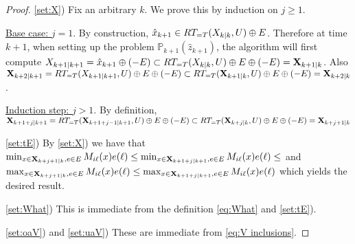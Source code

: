 \begin{proof}
	
\ref{set:X}) 
Fix an arbitrary $k$. We prove this by induction on $j \geq 1$.

\underline{Base case: $j=1$}. By construction, $\hat{x}_{k+1} \in RT_{=T}(X_{k|k},U) \oplus E$.
Therefore at time $k+1$, when setting up the problem $\mathbb{P}_{k+1}(\hat{z}_{k+1})$, the algorithm will first compute
$X_{k+1|k+1} = \hat{x}_{k+1} \oplus (-E)  \subset RT_{=T}(X_{k|k},U) \oplus E \oplus (-E) = \mathbf{X}_{k+1|k}$.
Also 
$\mathbf{X}_{k+2|k+1} = RT_{=T}(X_{k+1|k+1},U) \oplus E \oplus(-E) \subset  RT_{=T}(\mathbf{X}_{k+1|k},U) \oplus E \oplus(-E) = \mathbf{X}_{k+2|k}$.

\underline{Induction step: $j > 1$}.
By definition, $\mathbf{X}_{k+1+j|k+1} = RT_{=T}(\mathbf{X}_{k+1+j-1|k+1},U) \oplus E \oplus (-E) \subset  RT_{=T}(\mathbf{X}_{k+j|k},U) \oplus E \oplus (-E) = \mathbf{X}_{k+j+1|k}$

\ref{set:tE}) 	By \ref{set:X}) 
 we have that 
 $ \min_{x \in \mathbf{X}_{k+j+1|k}, e \in E} M_{i\ell}(x)e(\ell) \leq \min_{x \in \mathbf{X}_{k+1+j|k+1}, e \in E} M_{i\ell}(x)e(\ell) \leq $ and 
 $\max_{x \in \mathbf{X}_{k+j+1|k}, e \in E} M_{i\ell}(x)e(\ell) \leq \max_{x \in \mathbf{X}_{k+1+j|k+1}, e \in E} M_{i\ell}(x)e(\ell)$
 which yields the desired result.
 
 \ref{set:What}) This is immediate from the definition \eqref{eq:What} and \ref{set:tE}).
 
 \ref{set:oaV}) and \ref{set:uaV}) These are immediate from \eqref{eq:V inclusions}.
 
	\end{proof}
